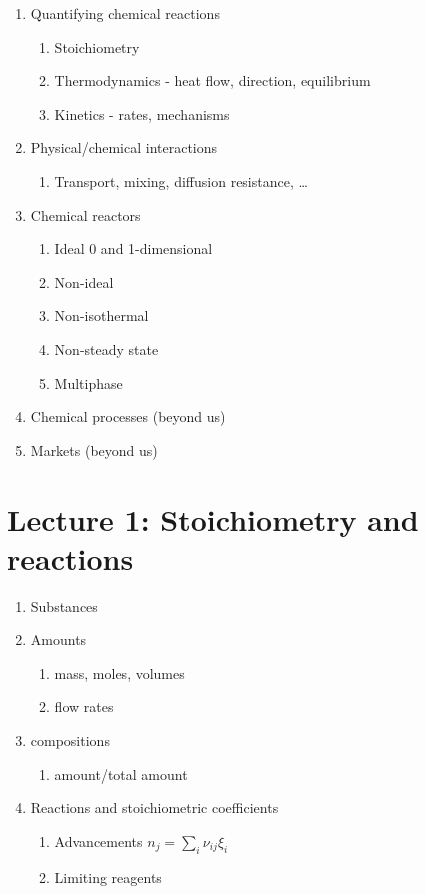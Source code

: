 \documentclass[11pt]{article}
\begin{document}
\begin{enumerate}
\begin{enumerate}
\item Quantifying chemical reactions
\begin{enumerate}
\item Stoichiometry
\item Thermodynamics - heat flow, direction, equilibrium
\item Kinetics - rates, mechanisms
\end{enumerate}
\item Physical/chemical interactions
\begin{enumerate}
\item Transport, mixing, diffusion resistance, \ldots{}
\end{enumerate}
\item Chemical reactors
\begin{enumerate}
\item Ideal 0 and 1-dimensional
\item Non-ideal
\item Non-isothermal
\item Non-steady state
\item Multiphase
\end{enumerate}
\item Chemical processes (beyond us)
\item Markets (beyond us)
\end{enumerate}
\end{enumerate}

\section{Lecture 1: Stoichiometry and reactions}
\label{sec:orga559425}
\begin{enumerate}
\item Substances
\item Amounts
\begin{enumerate}
\item mass, moles, volumes
\item flow rates
\end{enumerate}
\item compositions
\begin{enumerate}
\item amount/total amount
\end{enumerate}
\item Reactions and stoichiometric coefficients
\begin{enumerate}
\item Advancements \(n_j = \sum_i \nu_{ij} \xi_i\)
\item Limiting reagents
\end{enumerate}
\end{enumerate}
\end{document}
